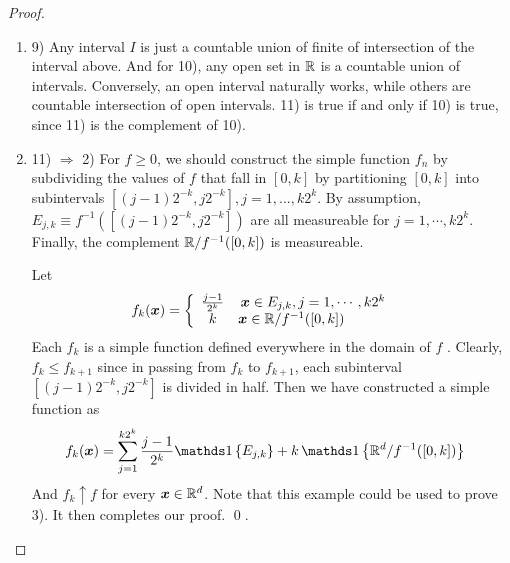 \documentclass[11pt]{article}
\begin{document}
\begin{itemize}
\begin{proof}
\begin{enumerate}
\item 9)  Any interval $I$ is just a countable union of finite of intersection of the interval above. And for 10), any open set in ${\mathbb R}$ is a countable union of intervals. Conversely, an open interval naturally works, while others are countable  intersection of open intervals. 11) is true if and only if 10) is true, since 11) is the complement of 10).
\item 11) $\Rightarrow$ 2)  For $f\ge 0$, we should construct the simple function $f_{n}$ by subdividing the values of $f$ that fall in $[0, k]$ by partitioning $[0, k]$ into subintervals $[(j - 1)2^{-k}, j2^{-k}], j = 1, . . . , k2^{k}$. By assumption, $E_{j,k}\equiv f^{-1}([(j - 1)2^{-k}, j2^{-k}])$ are all measureable for $j=1,\cdots, k2^{k}$. Finally, the complement ${\mathbb R}/f^{-1}([0,k])$ is measureable. 

Let
\begin{align*}
f_{k}(\boldsymbol{x}) &= \left\{\begin{array}{cc}
\frac{j-1}{2^{k}} & \boldsymbol{x}\in E_{j,k}, j=1,\cdots,k2^{k}  \\ 
k & \boldsymbol{x}\in {\mathbb R}/f^{-1}([0,k])\phantom{====}
\end{array} \right.
\end{align*} Each $f_k$ is a simple function defined everywhere in the domain of $f$ . Clearly, $f_k \le f_{k+1}$ since in passing from $f_k$ to $f_{k+1}$, each subinterval $[(j - 1)2^{-k}, j2^{-k}]$ is divided in half. Then we have constructed a simple function as
\begin{align*}
f_{k}(\mb{x}) &= \sum_{j=1}^{k2^{k}}\frac{j-1}{2^{k}}\ind{ E_{j,k}}+ k\,\ind{\bR^{d}/f^{-1}([0,k])}
\end{align*}
And $f_{k} \uparrow f$ for every $\boldsymbol{x}\in {\mathbb R}^{d}$. Note that this example could be used to prove 3).  It then completes our proof. \qed. 
\end{enumerate}
\end{proof}


\end{itemize}
\end{document}
